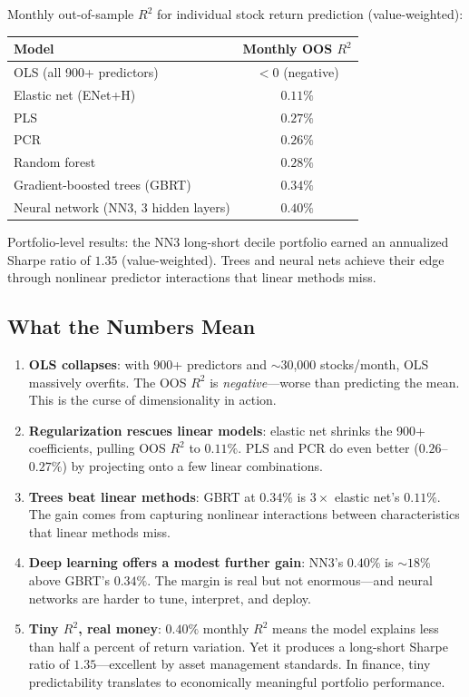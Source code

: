 \begin{keyresult}
Monthly out-of-sample $R^2$ for individual stock return prediction (value-weighted):
\begin{center}
\begin{tabular}{lc}
\toprule
\textbf{Model} & \textbf{Monthly OOS $R^2$} \\
\midrule
OLS (all 900+ predictors) & $< 0$ (negative) \\
Elastic net (ENet+H) & $0.11\%$ \\
PLS & $0.27\%$ \\
PCR & $0.26\%$ \\
Random forest & $0.28\%$ \\
Gradient-boosted trees (GBRT) & $\mathbf{0.34\%}$ \\
Neural network (NN3, 3 hidden layers) & $\mathbf{0.40\%}$ \\
\bottomrule
\end{tabular}
\end{center}

Portfolio-level results: the NN3 long-short decile portfolio earned an annualized Sharpe ratio of $1.35$ (value-weighted).
Trees and neural nets achieve their edge through nonlinear predictor interactions that linear methods miss.
\end{keyresult}

\subsection{What the Numbers Mean}

\begin{enumerate}[nosep]
  \item \textbf{OLS collapses}: with 900+ predictors and $\sim$30,000 stocks/month, OLS massively overfits. The OOS $R^2$ is \emph{negative}---worse than predicting the mean. This is the curse of dimensionality in action.

  \item \textbf{Regularization rescues linear models}: elastic net shrinks the 900+ coefficients, pulling OOS $R^2$ to $0.11\%$. PLS and PCR do even better ($0.26$--$0.27\%$) by projecting onto a few linear combinations.

  \item \textbf{Trees beat linear methods}: GBRT at $0.34\%$ is $3\times$ elastic net's $0.11\%$. The gain comes from capturing nonlinear interactions between characteristics that linear methods miss.

  \item \textbf{Deep learning offers a modest further gain}: NN3's $0.40\%$ is ${\sim}18\%$ above GBRT's $0.34\%$. The margin is real but not enormous---and neural networks are harder to tune, interpret, and deploy.

  \item \textbf{Tiny $R^2$, real money}: $0.40\%$ monthly $R^2$ means the model explains less than half a percent of return variation. Yet it produces a long-short Sharpe ratio of $1.35$---excellent by asset management standards. In finance, tiny predictability translates to economically meaningful portfolio performance.
\end{enumerate}

